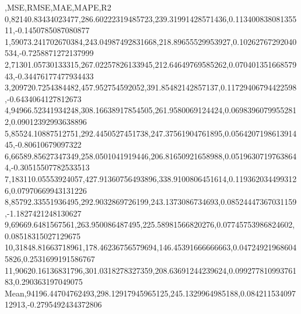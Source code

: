 ,MSE,RMSE,MAE,MAPE,R2
0,82140.83434023477,286.60222319485723,239.31991428571436,0.11340083808135511,-0.1450785087080877
1,59073.241702670384,243.04987492831668,218.89655529953927,0.10262767292040534,-0.7258871272137999
2,71301.05730133315,267.02257826133945,212.64649769585262,0.07040135166857943,-0.34476177477934433
3,209720.7254384482,457.952754592052,391.85482142857137,0.11729406794422598,-0.6434064127812673
4,94966.52341934248,308.16638917854505,261.9580069124424,0.06983960799552812,0.09012392993638896
5,85524.10887512751,292.4450527451738,247.37561904761895,0.056420719861391445,-0.80610679097322
6,66589.85627347349,258.0501041919446,206.81650921658988,0.05196307197638644,-0.30515507782533513
7,183110.05553924057,427.91360756493896,338.9100806451614,0.1193620344993126,0.07970669943131226
8,85792.33551936495,292.9032869726199,243.1373086734693,0.08524447367031159,-1.1827421248130627
9,69669.6481567561,263.950086487495,225.58981566820276,0.07745753986824602,0.08518315027129675
10,31848.81663718961,178.46236756579694,146.45391666666663,0.047249219686045826,0.2531699191586767
11,90620.16136831796,301.0318278327359,208.63691244239624,0.09927781099376183,0.290363197049075
Mean,94196.44704762493,298.12917945965125,245.1329964985188,0.08421153409712913,-0.2795492434372806
